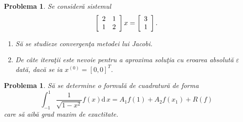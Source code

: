 \documentclass{article}%
\newtheorem{problem}[theorem]{Problema}
\begin{document}
\begin{problem}
Se consider\u{a} sistemul%
\[
\left[
\begin{array}
[c]{cc}%
2 & 1\\
1 & 2
\end{array}
\right]  x=\left[
\begin{array}
[c]{c}%
3\\
1
\end{array}
\right]  .
\]


\begin{enumerate}
\item S\u{a} se studieze convergen\c{t}a metodei lui Jacobi.

\item De c\^{a}te itera\c{t}ii este nevoie pentru a aproxima solu\c{t}ia cu
eroarea absolut\u{a} $\varepsilon$ dat\u{a}, dac\u{a} se ia $x^{(0)}%
=[0,0]^{T}.$
\end{enumerate}
\end{problem}

\begin{problem}
S\u{a} se determine o formul\u{a} de cuadratur\u{a} de forma
\[
\int_{-1}^{1}\frac{1}{\sqrt{1-x^{2}}}f(x)\mathrm{d}\,x=A_{1}f(1)+A_{2}%
f(x_{1})+R(f)
\]
care s\u{a} aib\u{a} grad maxim de exactitate.
\end{problem}
\end{document}
